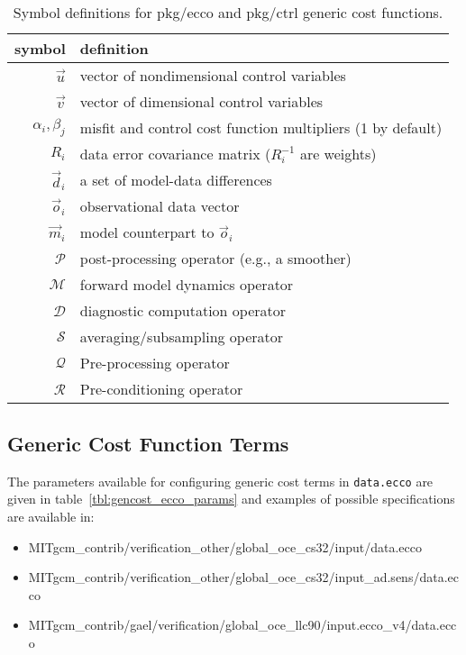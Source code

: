 \begin{table}[!ht]
\centering
\begin{tabular}{rl}
symbol			&	definition	\\ \hline
$\vec{u}$			&	vector of nondimensional control variables \\
$\vec{v}$			&	vector of dimensional control variables \\
$\alpha_i, \beta_j$	&	misfit and control cost function multipliers (1 by default) \\
$R_i$ 			&	data error covariance matrix ($R_i^{-1}$ are weights) \\
$\vec{d}_i$		&	a set of model-data differences \\
$\vec{o}_i$		&	observational data vector \\
$\vec{m}_i$		&	model counterpart to $\vec{o}_i$ \\
$\mathcal{P}$		&	post-processing operator (e.g., a smoother) \\
$\mathcal{M}$		&	forward model dynamics operator \\
$\mathcal{D}$		&	diagnostic computation operator \\
$\mathcal{S}$		&	averaging/subsampling operator \\
$\mathcal{Q}$		&	Pre-processing operator \\
$\mathcal{R}$		&	Pre-conditioning operator
\end{tabular}
\caption{Symbol definitions for pkg/ecco and pkg/ctrl generic cost functions.}
\label{tbl:gencost_symbols}
\end{table}

\subsection{Generic Cost Function Terms} \label{costgen}

The parameters available for configuring generic cost terms in \texttt{data.ecco} are given in table~\ref{tbl:gencost_ecco_params} and examples of possible specifications are available in:
\begin{itemize}
\itemsep0em
\item MITgcm\_contrib/verification\_other/global\_oce\_cs32/input/data.ecco
\item MITgcm\_contrib/verification\_other/global\_oce\_cs32/input\_ad.sens/data.ecco
\item MITgcm\_contrib/gael/verification/global\_oce\_llc90/input.ecco\_v4/data.ecco
\end{itemize}
 

